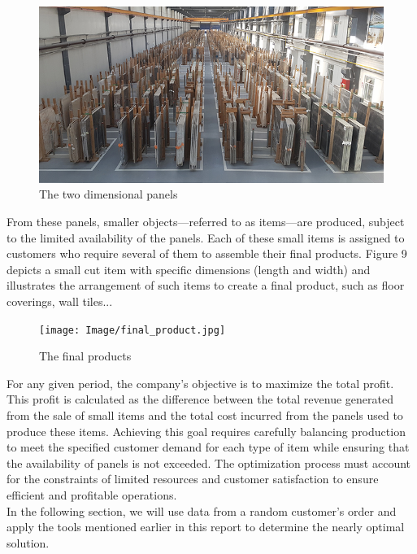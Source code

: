 \documentclass[a4paper]{article}
\begin{document}
    \begin{figure}[h]
        \centering
        \includegraphics[scale = 0.6]{Image/2D_panels.jpg}
        \caption{The two dimensional panels}
    \end{figure}
    \noindent
    From these panels, smaller objects—referred to as items—are produced, subject to the limited availability of the panels. Each of these small items is assigned to customers who require several of them to assemble their final products. Figure 9 depicts a small cut item with specific dimensions (length and width) and illustrates the arrangement of such items to create a final product, such as floor coverings, wall tiles...

    \begin{figure}[h]
        \centering
        \texttt{[image: Image/final\_product.jpg]}
        \caption{The final products}
    \end{figure}
    \vspace{0.2cm} \noindent
    For any given period, the company’s objective is to maximize the total profit. This profit is calculated as the difference between the total revenue generated from the sale of small items and the total cost incurred from the panels used to produce these items. Achieving this goal requires carefully balancing production to meet the specified customer demand for each type of item while ensuring that the availability of panels is not exceeded. The optimization process must account for the constraints of limited resources and customer satisfaction to ensure efficient and profitable operations.
    \vspace{0.2cm}\\
    In the following section, we will use data from a random customer’s order and apply the tools mentioned earlier in this report to determine the nearly optimal solution.
    \pagebreak
\end{document}
